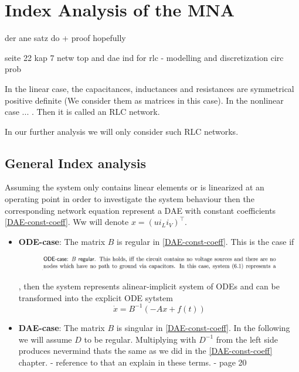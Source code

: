 \chapter{Index Analysis of the MNA}

der ane satz do + proof hopefully

seite 22 kap 7 netw top and dae ind for rlc - modelling and discretization circ prob

In the linear case, the capacitances, inductances and resistances are symmetrical positive definite (We consider them as matrices in this case). In the nonlinear case ... . Then it is called an RLC network.

In our further analysis we will only consider such RLC networks.

\section{General Index analysis}

Assuming the system only contains linear elements or is linearized at an operating point in order to investigate the system behaviour then the corresponding network equation represent a DAE with constant coefficients \ref{DAE-const-coeff}. Ww will denote $x=(u i_L i_V)^\top$.

\begin{itemize}
	\item \textbf{ODE-case}: \newline
	The matrix $B$ is regular in \ref{DAE-const-coeff}. This is the case if
	\begin{figure}[H]
		\centering
		\includegraphics[width=0.7\linewidth]{screenshot006}
		\caption{}
		\label{fig:screenshot006}
	\end{figure}
	, then the system represents  alinear-implicit system of ODEs and can be transformed into the explicit ODE sytstem
	\begin{displaymath}
		\dot{x}=B^{-1}(-Ax+f(t))
	\end{displaymath}
	
	\item \textbf{DAE-case}:
	The matrix $B$ is singular in \ref{DAE-const-coeff}. In the following we will assume $D$ to be regular. Multiplying with $D^{-1}$ from the left side produces
	\newline
	nevermind thats the same as we did in the \ref{DAE-const-coeff} chapter. - reference to that an explain in these terms. - page 20
\end{itemize}

